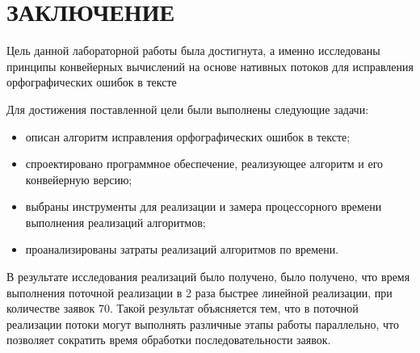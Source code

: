 \chapter*{ЗАКЛЮЧЕНИЕ}

Цель данной лабораторной работы была достигнута, а именно исследованы принципы конвейерных вычислений на основе нативных потоков для исправления орфографических ошибок в тексте

Для достижения поставленной цели были выполнены следующие задачи:
\begin{itemize}
	\item описан алгоритм исправления орфографических ошибок в тексте;
	\item спроектировано программное обеспечение, реализующее алгоритм и его конвейерную версию;
	\item выбраны инструменты для реализации и замера процессорного времени
	выполнения реализаций алгоритмов;
	\item проанализированы затраты реализаций алгоритмов по времени.
\end{itemize}


В результате исследования реализаций было получено, было получено, что время выполнения поточной реализации в 2 раза быстрее линейной реализации, при количестве заявок 70. 
Такой результат объясняется тем, что в поточной реализации потоки могут выполнять различные этапы работы параллельно, что позволяет сократить время обработки последовательности заявок.
